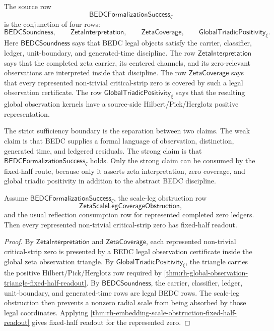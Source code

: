 \begin{definition}
\label{def:rh-bedc-formalization-success-zeta}
The source row
$$
\mathsf{BEDCFormalizationSuccess}_{\zeta}
$$
is the conjunction of four rows:
$$
\mathsf{BEDCSoundness},
\qquad
\mathsf{ZetaInterpretation},
\qquad
\mathsf{ZetaCoverage},
\qquad
\mathsf{GlobalTriadicPositivity}_{\xi}.
$$
Here $\mathsf{BEDCSoundness}$ says that BEDC legal objects satisfy the
carrier, classifier, ledger, unit-boundary, and generated-time
discipline.  The row $\mathsf{ZetaInterpretation}$ says that the
completed zeta carrier, its centered channels, and its zero-relevant
observations are interpreted inside that discipline.  The row
$\mathsf{ZetaCoverage}$ says that every represented non-trivial
critical-strip zero is covered by such a legal observation certificate.
The row $\mathsf{GlobalTriadicPositivity}_{\xi}$ says that the resulting
global observation kernels have a source-side Hilbert/Pick/Herglotz
positive representation.
\end{definition}

\begin{definition}
\label{def:rh-strict-sufficiency-boundary}
The strict sufficiency boundary is the separation between two claims.
The weak claim is that BEDC supplies a formal language of observation,
distinction, generated time, and ledgered residuals.  The strong claim
is that $\mathsf{BEDCFormalizationSuccess}_{\zeta}$ holds.  Only the
strong claim can be consumed by the fixed-half route, because only it
asserts zeta interpretation, zero coverage, and global triadic
positivity in addition to the abstract BEDC discipline.
\end{definition}

\begin{theorem}
\label{thm:rh-formalization-success-fixed-half-readout}
Assume $\mathsf{BEDCFormalizationSuccess}_{\zeta}$, the
scale-leg obstruction row
$$
\mathsf{ZetaScaleLegCoverageObstruction},
$$
and the usual reflection consumption row for represented completed zero
ledgers.  Then every represented non-trivial critical-strip zero has
fixed-half readout.
\end{theorem}

\begin{proof}
By $\mathsf{ZetaInterpretation}$ and $\mathsf{ZetaCoverage}$, each
represented non-trivial critical-strip zero is presented by a BEDC legal
observation certificate inside the global zeta observation triangle.  By
$\mathsf{GlobalTriadicPositivity}_{\xi}$, the triangle carries the
positive Hilbert/Pick/Herglotz row required by
\autoref{thm:rh-global-observation-triangle-fixed-half-readout}.  By
$\mathsf{BEDCSoundness}$, the carrier, classifier, ledger, unit-boundary,
and generated-time rows are legal BEDC rows.  The scale-leg obstruction
then prevents a nonzero radial scale from being absorbed by those legal
coordinates.  Applying
\autoref{thm:rh-embedding-scale-obstruction-fixed-half-readout} gives
fixed-half readout for the represented zero.
\end{proof}

